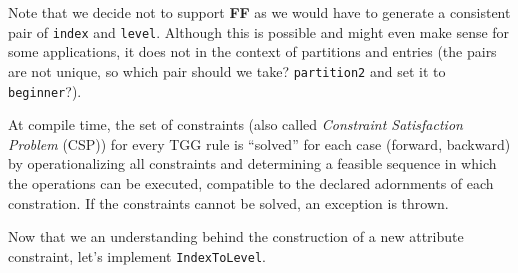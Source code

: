 Note that we decide not to support \textbf{FF} as we would have to generate a consistent pair of \texttt{index} and \texttt{level}. Although this is possible
and might even make sense for some applications, it does not in the context of partitions and entries (the pairs are not unique, so which pair should we
take? \texttt{partition2} and set it to \texttt{beginner}?).

At compile time, the set of constraints (also called \emph{Constraint Satisfaction Problem} (CSP)) for every TGG rule is ``solved'' for each case (forward,
backward) by operationalizing all constraints and determining a feasible sequence in which the operations can be executed, compatible to the declared adornments
of each constration. If the constraints cannot be solved, an exception is thrown.

Now that we an understanding behind the construction of a new attribute constraint, let's implement \texttt{IndexToLevel}.


